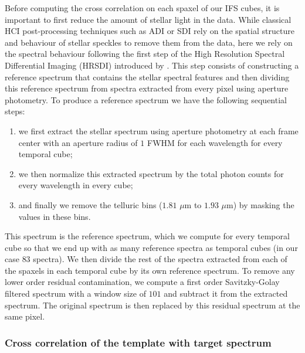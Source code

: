 \documentclass{aa}
\begin{document}
Before computing the cross correlation on each spaxel of our IFS cubes, it is important to first reduce the amount of stellar light in the data. 
While classical HCI post-processing techniques such as ADI or SDI rely on the spatial structure and behaviour of stellar speckles to remove them from the data, here we rely on the spectral behaviour following the first step of the High Resolution Spectral Differential Imaging (HRSDI) introduced by \citet{2019Haffert}. 
This step consists of constructing a reference spectrum that contains the stellar spectral features and then dividing \citep[or subtracting, in the case of][]{2019Haffert} this reference spectrum from spectra extracted from every pixel using aperture photometry. 
To produce a reference spectrum we have the following sequential steps:
\begin{enumerate}
    \item we first extract the stellar spectrum using aperture photometry at each frame center with an aperture radius of $1$ FWHM for each wavelength for every temporal cube;
    \item we then normalize this extracted spectrum by the total photon counts for every wavelength in every cube;
    \item and finally we remove the telluric bins ($1.81$ $\mu$m to $1.93$ $\mu$m) by masking the values in these bins.
\end{enumerate}
This spectrum is the reference spectrum, which we compute for every temporal cube so that we end up with as many reference spectra as temporal cubes (in our case $83$ spectra).
We then divide the rest of the spectra extracted from each of the spaxels in each temporal cube by its own reference spectrum.
To remove any lower order residual contamination, we compute a first order Savitzky-Golay filtered spectrum with a window size of $101$ and subtract it from the extracted spectrum. The original spectrum is then replaced by this residual spectrum at the same pixel.

\subsubsection{Cross correlation of the template with target spectrum}\label{sec: CC algorithm}
\end{document}
